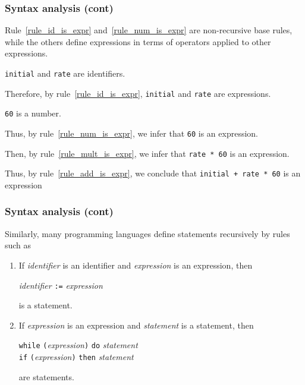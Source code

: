 %
\begin{frame}[containsverbatim]
\frametitle{Syntax analysis (cont)}

Rule~\ref{rule_id_is_expr} and~\ref{rule_num_is_expr} are
non-recursive base rules, while the others define expressions in terms
of operators applied to other expressions.

\bigskip

\texttt{initial} and \texttt{rate} are identifiers.

\bigskip

Therefore, by rule~\ref{rule_id_is_expr}, \texttt{initial} and
\texttt{rate} are expressions.

\bigskip

\texttt{60} is a number.

\bigskip

Thus, by rule~\ref{rule_num_is_expr}, we infer that \texttt{60} is an
expression.

\bigskip

Then, by rule~\ref{rule_mult_is_expr}, we infer that \verb|rate * 60|
is an expression.

\bigskip

Thus, by rule~\ref{rule_add_is_expr}, we conclude that
\verb|initial + rate * 60| is an expression

\end{frame}

%
\begin{frame}[containsverbatim]
\frametitle{Syntax analysis (cont)}

Similarly, many programming languages define statements recursively
by rules such as
\begin{enumerate}

  \item If \emph{identifier} is an identifier and
    \emph{expression} is an expression, then
    \begin{center}
      \emph{identifier} \verb|:=| \emph{expression}
    \end{center}
    is a statement.

  \item If \emph{expression} is an expression and \emph{statement} is
    a statement, then
    \begin{center}
       \texttt{while} \texttt{(}\emph{expression}\texttt{)}
       \texttt{do} \emph{statement}\\
       \texttt{if} \texttt{(}\emph{expression}\texttt{)} \texttt{then}
       \emph{statement}
    \end{center}
    are statements.
\end{enumerate}

\end{frame}

